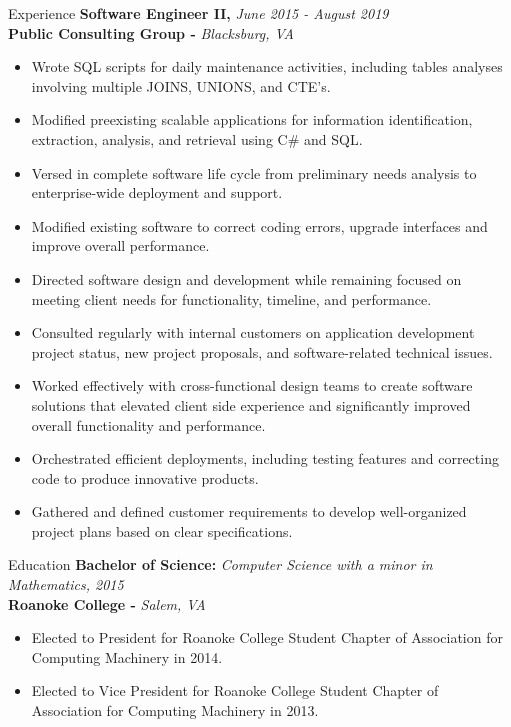 \documentclass{resume} %
\begin{document}
\begin{rSection}{Experience}
{\bf Software Engineer II, }{\em June 2015 - August 2019} 
\\
{\bf Public Consulting Group -  }{\em Blacksburg, VA}
\begin{itemize}
\item Wrote SQL scripts for daily maintenance activities, including tables analyses involving multiple JOINS, UNIONS, and CTE's.
\item Modified preexisting scalable applications for information identification, extraction, analysis, and retrieval using C\# and SQL.
\item Versed in complete software life cycle from preliminary needs analysis to enterprise-wide deployment and support.
\item Modified existing software to correct coding errors, upgrade interfaces and improve overall performance.
\item Directed software design and development while remaining focused on meeting client needs for functionality, timeline, and performance.
\item Consulted regularly with internal customers on application development project status, new project proposals, and software-related technical issues.
\item Worked effectively with cross-functional design teams to create software solutions that elevated client side experience and significantly improved overall functionality and performance.
\item Orchestrated efficient deployments, including testing features and correcting code to produce innovative products.
\item Gathered and defined customer requirements to develop well-organized project plans based on clear specifications.
\end{itemize}
\end{rSection}

\begin{rSection}{Education}
{\bf Bachelor of Science: }{\em Computer Science with a minor in Mathematics, 2015} 
\\
{\bf Roanoke College -  }{\em Salem, VA}
\begin{itemize}
\item Elected to President for Roanoke College Student Chapter of Association for Computing Machinery in 2014.
\item Elected to Vice President for Roanoke College Student Chapter of Association for Computing Machinery in 2013.
\end{itemize}
\end{rSection}
\end{document}
